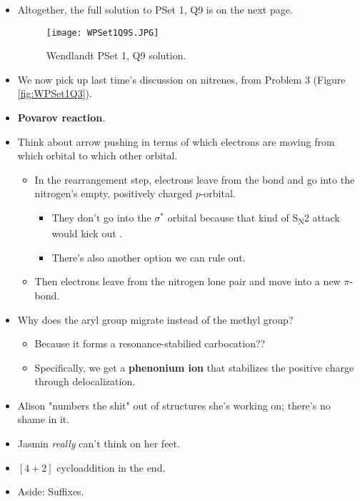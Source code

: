\documentclass[../notes.tex]{subfiles}
\begin{document}
\begin{itemize}
\begin{itemize}
    \end{itemize}
    \item Altogether, the full solution to PSet 1, Q9 is on the next page.
    \begin{figure}[h!]
        \centering
        \texttt{[image: WPSet1Q9S.JPG]}
        \caption{Wendlandt PSet 1, Q9 solution.}
        \label{fig:WPSet1Q9S}
    \end{figure}
    \pagebreak
    \item We now pick up last time's discussion on nitrenes, from Problem 3 (Figure \ref{fig:WPSet1Q3}).
    \item \textbf{Povarov reaction}.
    \item Think about arrow pushing in terms of which electrons are moving from which orbital to which other orbital.
    \begin{itemize}
        \item In the rearrangement step, electrons leave from the  bond and go into the nitrogen's empty, positively charged $p$-orbital.
        \begin{itemize}
            \item They don't go into the  $\sigma^*$ orbital because that kind of S\textsubscript{N}2 attack would kick out .
            \item There's also another option we can rule out.
        \end{itemize}
        \item Then electrons leave from the nitrogen lone pair and move into a new $\pi$-bond.
    \end{itemize}
    \item Why does the aryl group migrate instead of the methyl group?
    \begin{itemize}
        \item Because it forms a resonance-stabilied carbocation??
        \item Specifically, we get a \textbf{phenonium ion} that stabilizes the positive charge through delocalization.
    \end{itemize}
    \item Alison "numbers the shit" out of structures she's working on; there's no shame in it.
    \item Jasmin \emph{really} can't think on her feet.
    \item $[4+2]$ cycloaddition in the end.
    \item Aside: Suffixes.
    \begin{itemize}

\end{itemize}
\end{itemize}
\end{document}
